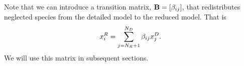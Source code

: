 Note that we can introduce a transition matrix, $\mathbf{B} = \left[\beta_{ij}\right]$, that 
redistributes neglected species from the detailed model to the reduced model.  That is
\begin{align}
  x_{i}^{R} = \sum_{j=N_{R} + 1}^{N_{D}}{\beta_{ij}x_{j}^{D}}. \label{eq:transition}
\end{align}
We will use this matrix in subsequent sections.
















